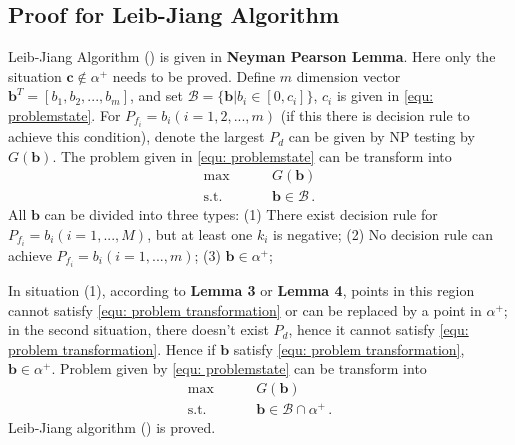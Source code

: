 \documentclass[12pt,journal,a4paper,twoside,onecolumn,draft]{IEEEtran}
\newcommand{\rmnum}[1]{\romannumeral #1}
\begin{document}
\begin{spacing}{2.5}
\subsection{Proof for Leib-Jiang Algorithm }
Leib-Jiang Algorithm (\rmnum{1}) is given in \textbf{Neyman Pearson Lemma}. Here only the situation  $\mathbf{c} \notin \alpha^+$ needs to be proved.
Define $m$ dimension vector $\mathbf{b}^T = [b_1, b_2, ..., b_m]$, and set $\mathcal{B} = \{ \mathbf{b} |  b_i \in [0, c_i] \}$, $c_i$
is given in \eqref{equ: problemstate}. For $P_{f_i} = b_i (i = 1, 2, ..., m)$ (if this there is decision rule to achieve this condition), denote the largest $P_d$ can be given by NP testing by $G(\mathbf{b})$. The problem given in \eqref{equ: problemstate} can be transform into
\begin{equation}
\label{equ: problem transformation}
\begin{split}
\max\;\;\;\;\;\;\;\;&G(\mathbf{b})\\
\text{s.t.}\;\;\;\;\;\;\;\;& \mathbf{b} \in \mathcal{B}\,.
\end{split}
\end{equation}
All $\mathbf{b}$ can be divided into three types: (1) There exist decision rule for $P_{f_i} = b_i (i = 1, ..., M)$, but at least one $k_i$ is negative; (2) No decision rule can achieve $P_{f_i} = b_i (i = 1, ..., m)$; (3) $\mathbf{b} \in \alpha^+$;

In situation (1), according to \textbf{Lemma 3} or \textbf{Lemma 4},  points in this region cannot satisfy \eqref{equ: problem transformation} or can be replaced by a point in $\alpha^+$; in the second situation, there doesn't exist $P_d$, hence it cannot satisfy \eqref{equ: problem transformation}. Hence if $\mathbf{b}$ satisfy \eqref{equ: problem transformation}, $\mathbf{b} \in \alpha^+$.  Problem given by \eqref{equ: problemstate} can be transform into
\begin{equation}
\label{equ: problem transformation 2}
\begin{split}
\max\;\;\;\;\;\;\;\;&G(\mathbf{b})\\
\text{s.t.}\;\;\;\;\;\;\;\;& \mathbf{b} \in \mathcal{B} \cap \alpha^+ \,.
\end{split}
\end{equation}
Leib-Jiang algorithm (\rmnum{2}) is proved.


\end{spacing}
\end{document}
